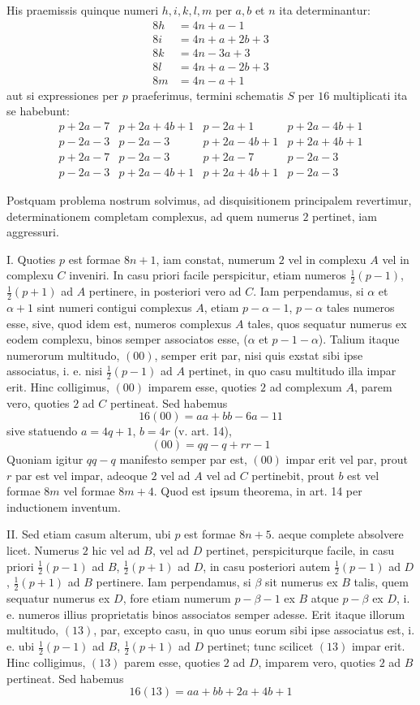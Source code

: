 His praemissis quinque numeri $h,i,k,l,m$ per $a,b$ et $n$ ita determinantur:
\[
\begin{aligned}
8h&=4n+a-1\\
8i&=4n+a+2b+3\\
8k&=4n-3a+3\\
8l&=4n+a-2b+3\\
8m&=4n-a+1
\end{aligned}
\]
aut si expressiones per $p$ praeferimus, termini schematis $S$ per $16$ multiplicati ita se habebunt:
\[
\begin{array}{l|l|l|l}
p+2a-7&p+2a+4b+1&p-2a+1&p+2a-4b+1\\
p-2a-3&p-2a-3&p+2a-4b+1&p+2a+4b+1\\
p+2a-7&p-2a-3&p+2a-7&p-2a-3\\
p-2a-3&p+2a-4b+1&p+2a+4b+1&p-2a-3
\end{array}
\]

%
Postquam problema nostrum solvimus, ad disquisitionem principalem revertimur, determinationem completam complexus, ad quem numerus $2$ pertinet, iam aggressuri.

I. Quoties $p$ est formae $8n+1$, iam constat, numerum $2$ vel in complexu $A$ vel in complexu $C$ inveniri. In casu priori facile perspicitur, etiam numeros $\frac12(p-1)$, $\frac12(p+1)$ ad $A$ pertinere, in posteriori vero ad $C$. Iam perpendamus, si $\alpha$ et $\alpha+1$ sint numeri contigui complexus $A$, etiam $p-\alpha-1$, $p-\alpha$ tales numeros esse, sive, quod idem est, numeros complexus $A$ tales, quos sequatur numerus ex eodem complexu, binos semper associatos esse, ($\alpha$ et $p-1-\alpha$). Talium itaque numerorum multitudo, $(00)$, semper erit par, nisi quis exstat sibi ipse associatus, i. e. nisi $\frac12(p-1)$ ad $A$ pertinet, in quo casu multitudo illa impar erit. Hinc colligimus, $(00)$ imparem esse, quoties $2$ ad complexum $A$, parem vero, quoties $2$ ad $C$ pertineat. Sed habemus
\[
16(00)=aa+bb-6a-11
\]
sive statuendo $a=4q+1$, $b=4r$ (v. art. 14),
\[
(00)=qq-q+rr-1
\]
Quoniam igitur $qq-q$ manifesto semper par est, $(00)$ impar erit vel par, prout $r$ par est vel impar, adeoque $2$ vel ad $A$ vel ad $C$ pertinebit, prout $b$ est vel formae $8m$ vel formae $8m+4$. Quod est ipsum theorema, in art. 14 per inductionem inventum.

II. Sed etiam casum alterum, ubi $p$ est formae $8n+5$. aeque complete absolvere licet. Numerus $2$ hic vel ad $B$, vel ad $D$ pertinet, perspiciturque facile, in casu priori $\frac12(p-1)$ ad $B$, $\frac12(p+1)$ ad $D$, in casu posteriori autem $\frac12(p-1)$ ad $D$, $\frac12(p+1)$ ad $B$ pertinere. Iam perpendamus, si $\beta$ sit numerus ex $B$ talis, quem sequatur numerus ex $D$, fore etiam numerum $p-\beta-1$ ex $B$ atque $p-\beta$ ex $D$, i. e. numeros illius proprietatis binos associatos semper adesse. Erit itaque illorum multitudo, $(13)$, par, excepto casu, in quo unus eorum sibi ipse associatus est, i. e. ubi $\frac12(p-1)$ ad $B$, $\frac12(p+1)$ ad $D$ pertinet; tunc scilicet $(13)$ impar erit. Hinc colligimus, $(13)$ parem esse, quoties $2$ ad $D$, imparem vero, quoties $2$ ad $B$ pertineat. Sed habemus
\[
16(13)=aa+bb+2a+4b+1
\]

